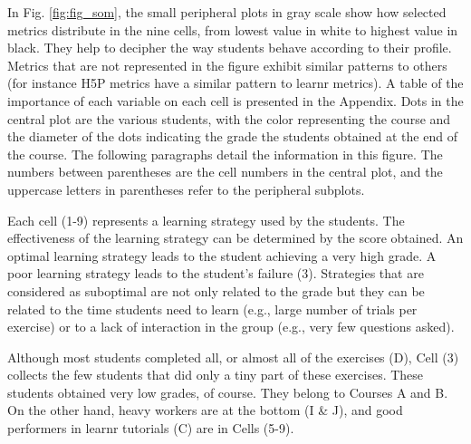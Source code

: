 \documentclass{aims}
\theoremstyle{definition}
\begin{document}
In Fig. \ref {fig:fig_som}, the small peripheral plots in gray scale
show how selected metrics distribute in the nine cells, from lowest
value in white to highest value in black. They help to decipher the way
students behave according to their profile. Metrics that are not
represented in the figure exhibit similar patterns to others (for
instance H5P metrics have a similar pattern to learnr metrics). A table
of the importance of each variable on each cell is presented in the
Appendix. Dots in the central plot are the various students, with the
color representing the course and the diameter of the dots indicating
the grade the students obtained at the end of the course. The following
paragraphs detail the information in this figure. The numbers between
parentheses are the cell numbers in the central plot, and the uppercase
letters in parentheses refer to the peripheral subplots.

Each cell (1-9) represents a learning strategy used by the students. The
effectiveness of the learning strategy can be determined by the score
obtained. An optimal learning strategy leads to the student achieving a
very high grade. A poor learning strategy leads to the student's failure
(3). Strategies that are considered as suboptimal are not only related
to the grade but they can be related to the time students need to learn
(e.g., large number of trials per exercise) or to a lack of interaction
in the group (e.g., very few questions asked).

Although most students completed all, or almost all of the exercises
(D), Cell (3) collects the few students that did only a tiny part of
these exercises. These students obtained very low grades, of course.
They belong to Courses A and B. On the other hand, heavy workers are at
the bottom (I \& J), and good performers in learnr tutorials (C) are in
Cells (5-9).
\end{document}
